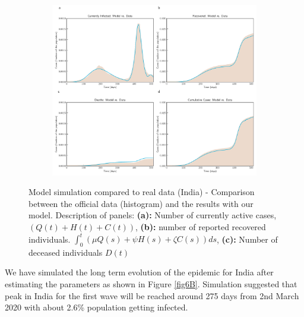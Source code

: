 \documentclass[10pt]{wlscirep}
\begin{document}
\begin{figure}[t!]
	\centering
	\begin{subfigure}[b]{\textwidth}
		\centering
		\includegraphics[width=1\linewidth]{India_plot_model_data.pdf}
	\end{subfigure}
	\caption{Model simulation compared to real data (India) - Comparison between the official data (histogram) and the results with our model. Description of panels: \textbf{(a):} Number of currently active cases, $\left( Q(t) + H(t) + C(t)\right)$, \textbf{(b):} number of reported recovered individuals. $\int_{0}^{t}{\left( \mu Q(s) + \psi H(s) + \zeta  C(s) \right) ds}$, \textbf{(c):} Number of deceased individuals $D(t)$}
	\label{fig6A} 
\end{figure}

We have simulated the long term evolution of the epidemic for India after estimating the parameters as shown in Figure \ref{fig6B}. Simulation suggested that peak in India for the first wave will be reached around 275 days from 2nd March 2020 with about 2.6\% population getting infected. 
\end{document}

